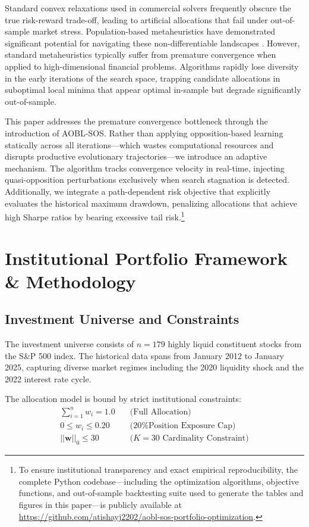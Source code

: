 \documentclass[11pt,a4paper]{article}
\begin{document}
Standard convex relaxations used in commercial solvers frequently obscure the true risk-reward trade-off, leading to artificial allocations that fail under out-of-sample market stress. Population-based metaheuristics have demonstrated significant potential for navigating these non-differentiable landscapes \cite{cheng2014}. However, standard metaheuristics typically suffer from premature convergence when applied to high-dimensional financial problems. Algorithms rapidly lose diversity in the early iterations of the search space, trapping candidate allocations in suboptimal local minima that appear optimal in-sample but degrade significantly out-of-sample.

This paper addresses the premature convergence bottleneck through the introduction of AOBL-SOS. Rather than applying opposition-based learning statically across all iterations—which wastes computational resources and disrupts productive evolutionary trajectories—we introduce an adaptive mechanism. The algorithm tracks convergence velocity in real-time, injecting quasi-opposition perturbations exclusively when search stagnation is detected. Additionally, we integrate a path-dependent risk objective that explicitly evaluates the historical maximum drawdown, penalizing allocations that achieve high Sharpe ratios by bearing excessive tail risk.\footnote{To ensure institutional transparency and exact empirical reproducibility, the complete Python codebase—including the optimization algorithms, objective functions, and out-of-sample backtesting suite used to generate the tables and figures in this paper—is publicly available at \url{https://github.com/atishayj2202/aobl-sos-portfolio-optimization}.}

\section{Institutional Portfolio Framework \& Methodology}

\subsection{Investment Universe and Constraints}
The investment universe consists of $n = 179$ highly liquid constituent stocks from the S\&P 500 index. The historical data spans from January 2012 to January 2025, capturing diverse market regimes including the 2020 liquidity shock and the 2022 interest rate cycle. 

The allocation model is bound by strict institutional constraints:
\begin{align}
\sum_{i=1}^{n} w_i = 1.0 \quad &\text{(Full Allocation)} \\
0 \le w_i \le 0.20 \quad &\text{(20\% Position Exposure Cap)} \\
||\mathbf{w}||_0 \le 30 \quad &\text{($K=30$ Cardinality Constraint)}
\end{align}
\end{document}
